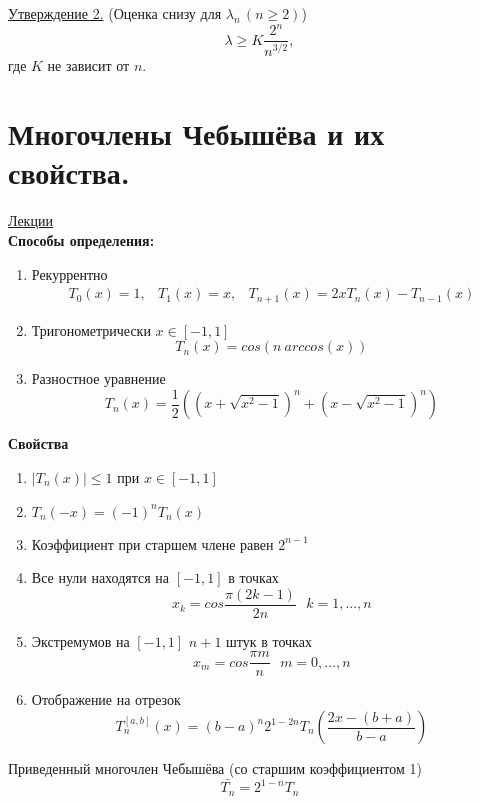 \documentclass[specialist, subf, href, colorlinks=true, 12pt, times, mtpro, final]{disser}
\theoremstyle{definition}
\begin{document}
    \noindent \hyperlink{lects.17}{Утверждение 2.} (Оценка снизу для $\lambda_n\,(n\ge 2)$)
    $$
        \lambda \ge K \frac {2^n}{n^{3/2}}, 
    $$ 
    где $K$ не зависит от $n$. \\
    

\section {Многочлены Чебышёва и их свойства.}
    \hyperlink {lects.18}{Лекции}\\
    \textbf{Способы определения:}
    \begin{enumerate}
        \item Рекуррентно 
              $$
                \begin{array}{lcr}
                    T_0(x) = 1, & T_1(x) = x, & T_{n+1}(x) = 2xT_n(x) - T_{n-1}(x)
                \end{array}
              $$
        \item Тригонометрически $x\in[-1,1]$
              $$
                T_n(x) = cos(n \ arccos(x))
              $$
        \item Разностное уравнение
              $$
                T_n(x) = \frac{1}{2}\left( \left( x + \sqrt{x^2 - 1} \right)^n + \left( x - \sqrt{x^2 - 1} \right)^n \right)
              $$
    \end{enumerate}
    \textbf{Свойства}
    \begin{enumerate}
        \item $|T_n(x)| \le 1$ при $x \in [-1,1]$
        \item $T_n(-x) = (-1)^nT_n(x)$
        \item Коэффициент при старшем члене равен $2^{n - 1}$
        \item Все нули находятся на $[-1,1]$ в точках
            $$
                x_k = cos \frac{\pi (2k -1)}{2n} \ \ \ k = 1, ... , n
            $$
        \item Экстремумов на $[-1,1]$ $n+1$ штук в точках
            $$
                x_m = cos \frac{\pi m}{n} \ \ \ m = 0, ... , n
            $$ 
        \item Отображение на отрезок 
            $$
                T_n^{[a,b]} (x) = (b - a)^n 2^{1-2n} T_n \left( \frac{2x - (b+a)}{b-a} \right)
            $$
    \end{enumerate}

    Приведенный многочлен Чебышёва (со старшим коэффициентом 1)
    $$
        \bar {T_n} = 2^{1 - n}T_n
    $$
    
\end{document}
